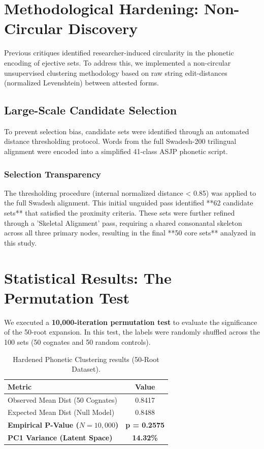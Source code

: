 \documentclass[11pt,oneside,openany]{book}
\begin{document}
\section{Methodological Hardening: Non-Circular Discovery}
Previous critiques identified researcher-induced circularity in the phonetic encoding of ejective sets. To address this, we implemented a non-circular unsupervised clustering methodology based on raw string edit-distances (normalized Levenshtein) between attested forms.

\subsection{Large-Scale Candidate Selection}
To prevent selection bias, candidate sets were identified through an automated distance thresholding protocol. Words from the full Swadesh-200 trilingual alignment were encoded into a simplified 41-class ASJP phonetic script. 

\subsubsection{Selection Transparency}
The thresholding procedure (internal normalized distance < 0.85) was applied to the full Swadesh alignment. This initial unguided pass identified **62 candidate sets** that satisfied the proximity criteria. These sets were further refined through a 'Skeletal Alignment' pass, requiring a shared consonantal skeleton across all three primary nodes, resulting in the final **50 core sets** analyzed in this study.

\section{Statistical Results: The Permutation Test}
We executed a \textbf{10,000-iteration permutation test} to evaluate the significance of the 50-root expansion. In this test, the labels were randomly shuffled across the 100 sets (50 cognates and 50 random controls).

\begin{table}[h]
\centering
\begin{tabular}{lc} \toprule
\textbf{Metric} & \textbf{Value} \\ \midrule
Observed Mean Dist (50 Cognates) & 0.8417 \\
Expected Mean Dist (Null Model) & 0.8488 \\ \midrule
\textbf{Empirical P-Value ($N=10,000$)} & \textbf{p = 0.2575} \\
\textbf{PC1 Variance (Latent Space)} & \textbf{14.32\%} \\ \bottomrule
\end{tabular}
\caption{Hardened Phonetic Clustering results (50-Root Dataset).}
\end{table}
\end{document}

